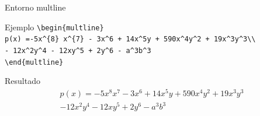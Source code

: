 \documentclass[aspectratio=169, 10pt]{beamer}
\begin{document}
\begin{frame}[fragile]{Entorno multline}
\begin{block}{Ejemplo}
    \verb|\begin{multline}|\\
    \hspace{1cm}\verb|p(x) =-5x^{8} x^{7} - 3x^6 + 14x^5y + 590x^4y^2 + 19x^3y^3\\| \\
    \hspace{1cm} \verb|- 12x^2y^4 - 12xy^5 + 2y^6 - a^3b^3| \\
    \verb|\end{multline}|
\end{block}

\begin{exampleblock}{Resultado}
    \begin{multline}
            p(x) =-5x^{8} x^{7} - 3x^6 + 14x^5y + 590x^4y^2 + 19x^3y^3\\ 
            - 12x^2y^4 - 12xy^5 + 2y^6 - a^3b^3
        \end{multline}
\end{exampleblock}      
\end{frame}
\end{document}
